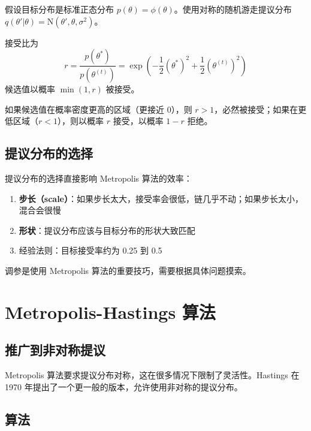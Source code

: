 \begin{Example}[一维高斯目标分布]
  假设目标分布是标准正态分布 $p(\theta) = \phi(\theta)$。使用对称的随机游走提议分布 $q(\theta' | \theta) = \mathrm{N}(\theta', \theta, \sigma^2)$。

  接受比为
  \begin{equation}\label{eq:gaussian-acceptance-ratio}
  r = \frac{p(\theta^*)}{p(\theta^{(t)})} = \exp\!\left(-\frac{1}{2}(\theta^*)^2 + \frac{1}{2}(\theta^{(t)})^2\right)
  \end{equation}
  候选值以概率 $\min(1, r)$ 被接受。

  如果候选值在概率密度更高的区域（更接近 0），则 $r > 1$，必然被接受；如果在更低区域（$r < 1$），则以概率 $r$ 接受，以概率 $1 - r$ 拒绝。
\end{Example}

\subsection{提议分布的选择}

提议分布的选择直接影响 Metropolis 算法的效率：

\begin{enumerate}
  \item \textbf{步长（scale）}：如果步长太大，接受率会很低，链几乎不动；如果步长太小，混合会很慢
  \item \textbf{形状}：提议分布应该与目标分布的形状大致匹配
  \item 经验法则：目标接受率约为 0.25 到 0.5
\end{enumerate}

调参是使用 Metropolis 算法的重要技巧，需要根据具体问题摸索。

\section{Metropolis-Hastings 算法}

\subsection{推广到非对称提议}

Metropolis 算法要求提议分布对称，这在很多情况下限制了灵活性。Hastings 在 1970 年提出了一个更一般的版本，允许使用非对称的提议分布。

\subsection{算法}

